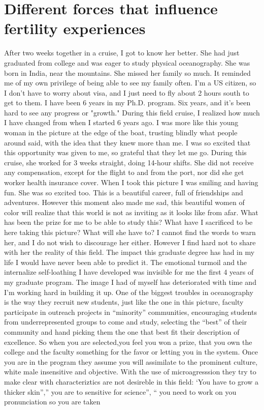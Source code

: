 \documentclass{tufte-handout}
\begin{document}
\section{Different forces that influence fertility experiences}\label{sec:page-layout}
After two weeks together in a cruise, I got to know her better. She had just graduated from college and was eager to study physical oceanography. She was born in India, near the mountains. She missed her family so much. It reminded me of my own privilege of being able to see my family often. I'm a US citizen, so I don't have to worry about visa, and I just need to fly about 2 hours south to get to them. I have been 6 years in my Ph.D. program. Six years, and it's been hard to see any progress or "growth." During this field cruise, I realized how much I have changed from when I started 6 years ago. I was more like this young woman in the picture at the edge of the boat, trusting blindly what people around said, with the idea that they knew more than me. I was so excited that this opportunity was given to me, so grateful that they let me go. During this cruise, she worked for 3 weeks straight, doing 14-hour shifts. She did not receive any compensation, except for the flight to and from the port, nor did she get worker health insurance cover. When I took this picture I was smiling and having fun. She was so excited too. This is a beautiful career, full of friendships and adventures. However this moment also made me sad, this beautiful women of color will realize that this world is not as inviting as it looks like from afar. What has been the prize for me to be able to study this? What have I sacrificed to be here taking this picture? What will she have to? I cannot find the words to warn her, and I do not wish to discourage her either. However I find hard not to share with her the reality of this field. The impact this graduate degree has had in my life I would have never been able to predict it. The emotional turmoil and the internalize self-loathing I have developed was invisible for me the first 4 years of my graduate program. The image I had of myself has deteriorated with time and I’m working hard in building it up. One of the biggest troubles in oceanography is the way they recruit new students, just like the one in this picture, faculty participate in outreach projects in “minority” communities, encouraging students from underrepresented groups to come and study, selecting the “best” of their community and hand picking them the one that best fit their description of excellence. So when you are selected,you feel you won a prize, that you own the college and the faculty something for the favor or letting you in the system. Once you are in the program they assume you will assimilate to the prominent culture, white male insensitive and objective. With the use of microagresssion they try to make clear with characteriztics are not desireble in this field: ‘You have to grow a thicker skin”,” you are to sensitive for science”, “ you need to work on you pronunciation so you are taken 
\end{document}
